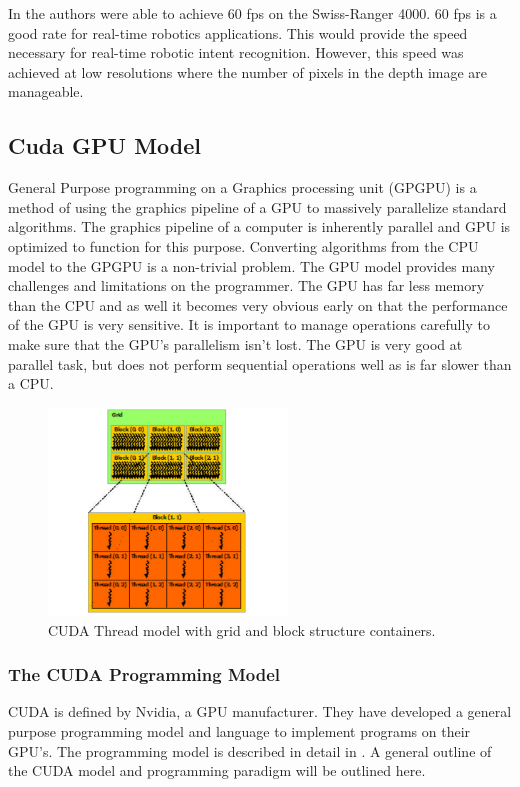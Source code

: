 \documentclass[conference]{IEEEtran}
\begin{document}
In \cite{Baak2011} the authors were able to achieve 60 fps on the Swiss-Ranger 4000. 60 fps is a good rate for real-time robotics applications. This would provide the speed necessary for real-time robotic intent recognition. However, this speed was achieved at low resolutions where the number of pixels in the depth image are manageable. 

\subsection{Cuda GPU Model}
\label{subsec:cudaModel}
General Purpose programming on a Graphics processing unit (GPGPU) is a method of using the graphics pipeline of a GPU to massively parallelize standard algorithms. The graphics pipeline of a computer is inherently parallel and GPU is optimized to function for this purpose. Converting algorithms from the CPU model to the GPGPU is a non-trivial problem. The GPU model provides many challenges and limitations on the programmer. The GPU has far less memory than the CPU and as well it becomes very obvious early on that the performance of the GPU is very sensitive. It is important to manage operations carefully to make sure that the GPU's parallelism isn't lost. The GPU is very good at parallel task, but does not perform sequential operations well as is far slower than a CPU.

\begin{figure}[!t]
\centering
\includegraphics[width=2.5in]{grid-of-thread-blocks}
\caption{CUDA Thread model with grid and block structure containers.}
\label{fig:gridthreadblocks}
\end{figure}
\subsubsection{The CUDA Programming Model}
CUDA is defined by Nvidia\texttrademark, a GPU manufacturer\cite{Nvidia2014}. They have developed a general purpose programming model and language to implement programs on their GPU's. The programming model is described in detail in \cite{Nvidia2014}. A general outline of the CUDA model and programming paradigm will be outlined here.
\end{document}
